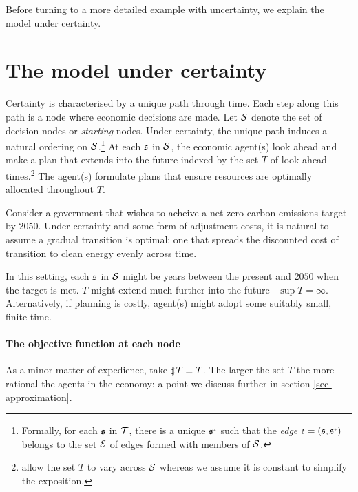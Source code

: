 \documentclass[12pt,a4paper,twoside, draft]{article}
\begin{document}
Before turning to a more detailed example with uncertainty, we explain the
model under certainty.
\section{The model under certainty}\label{sec-certainty}
Certainty is characterised by a unique path through time.
Each step along this path is a node where economic decisions are made.
Let $\mathcal{S}$ denote the set of decision nodes or \emph{starting} nodes.
Under certainty, the unique path induces a natural ordering on
$\mathcal{S}$.\footnote{
  Formally, for each $\mathfrak{s}$ in $\mathcal T$, there is a unique
  $\node^{\mplus}$ such that the \emph{edge} $\edge = (\node, \node^{\mplus})$
  belongs to the set $\mathcal{E}$ of edges formed with members of $\mathcal{S}$.
}
At each $\mathfrak{s}$ in $\mathcal{S}$, the economic agent(s) look ahead and make a plan
that extends into the future indexed by the set $T$ of look-ahead
times.\footnote{\citet{CJ} allow the set $T$ to vary across $\mathcal{S}$ whereas we
assume it is constant to simplify the exposition.}
The agent(s) formulate plans that ensure resources are optimally allocated
throughout $T$.

\begin{example}
  Consider a government that wishes to acheive a net-zero carbon emissions
  target by 2050.
  Under certainty and some form of adjustment costs, it is natural to
  assume a gradual transition is optimal: one that spreads the discounted cost
  of transition to clean energy evenly across time.
  
  In this setting, each $\mathfrak{s}$ in $\mathcal{S}$ might be years between the present
  and $2050$ when the target is met.
  $T$ might extend much further into the future \eg\ $\sup T = \infty$.
  Alternatively, if planning is costly, agent(s) might adopt some suitably
  small, finite time.
\end{example}

\paragraph{The objective function at each node}
As a minor matter of expedience, take $\mathbin{\sharp}\hskip1pt T \equiv T$.
The larger the set $T$ the more rational the agents in the economy: a point we
discuss further in section \ref{sec-approximation}.
\end{document}
